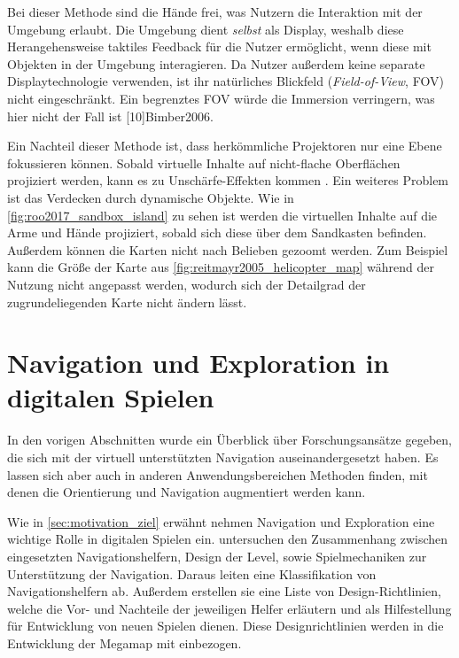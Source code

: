 Bei dieser Methode sind die Hände frei, was Nutzern die Interaktion mit der Umgebung erlaubt.
Die Umgebung dient \emph{selbst} als Display, weshalb diese Herangehensweise taktiles Feedback für die Nutzer ermöglicht, wenn diese mit Objekten in der Umgebung interagieren.
Da Nutzer außerdem keine separate Displaytechnologie verwenden, ist ihr natürliches Blickfeld (\emph{Field-of-View}, FOV) nicht eingeschränkt.
Ein begrenztes FOV würde die Immersion verringern, was hier nicht der Fall ist \parencite[3\pageff]{Krevelen2010}[10]{Bimber2006}.

Ein Nachteil dieser Methode ist, dass herkömmliche Projektoren nur eine Ebene fokussieren können.
Sobald virtuelle Inhalte auf nicht-flache Oberflächen projiziert werden, kann es zu Unschärfe-Effekten kommen \parencite[10]{Bimber2006}.
Ein weiteres Problem ist das Verdecken durch dynamische Objekte.
Wie in \autoref{fig:roo2017_sandbox_island} zu sehen ist werden die virtuellen Inhalte auf die Arme und Hände projiziert, sobald sich diese über dem Sandkasten befinden.
Außerdem können die Karten nicht nach Belieben gezoomt werden.
Zum Beispiel kann die Größe der Karte aus \autoref{fig:reitmayr2005_helicopter_map} während der Nutzung nicht angepasst werden, wodurch sich der Detailgrad der zugrundeliegenden Karte nicht ändern lässt.
\vfill

\section{Navigation und Exploration in digitalen Spielen}
In den vorigen Abschnitten wurde ein Überblick über Forschungsansätze gegeben, die sich mit der virtuell unterstützten Navigation auseinandergesetzt haben.
Es lassen sich aber auch in anderen Anwendungsbereichen Methoden finden, mit denen die Orientierung und Navigation augmentiert werden kann.

Wie in \autoref{sec:motivation_ziel} erwähnt nehmen Navigation und Exploration eine wichtige Rolle in digitalen Spielen ein.
\textcites{Moura2014}{Moura2015} untersuchen den Zusammenhang zwischen eingesetzten Navigationshelfern, Design der Level, sowie Spielmechaniken zur Unterstützung der Navigation.
Daraus leiten \textcite{Moura2015} eine Klassifikation von Navigationshelfern ab.
Außerdem erstellen sie eine Liste von Design-Richtlinien, welche die Vor- und Nachteile der jeweiligen Helfer erläutern und als Hilfestellung für Entwicklung von neuen Spielen dienen.
Diese Designrichtlinien werden in die Entwicklung der Megamap mit einbezogen.

